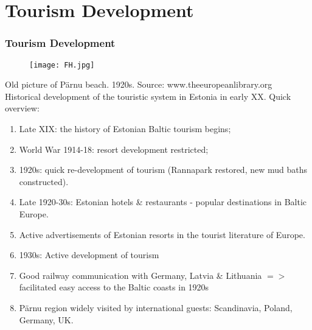 \documentclass[pdflatex,compress,8pt,
	xcolor={dvipsnames,dvipsnames,svgnames,x11names,table},
]{beamer}
\begin{document}
\section{Tourism Development}
\begin{frame}\frametitle{Tourism Development}
\begin{figure}[H]
	\centering
		\texttt{[image: FH.jpg]}
\end{figure}
Old picture of Pärnu beach. 1920s. Source: www.theeuropeanlibrary.org\\
Historical development of the touristic system in Estonia in early XX. Quick overview:
\begin{enumerate}
	\item Late XIX: the history of Estonian Baltic tourism begins;
	\item {} World War 1914-18: resort development restricted;
	\item 1920s: quick re-development of tourism (Rannapark restored, new mud baths constructed).
	\item Late 1920-30s: Estonian hotels \& restaurants - popular destinations in Baltic Europe.
	\item Active advertisements of Estonian resorts in the tourist literature of Europe.
	\item 1930s: Active development of tourism
	\item  Good railway communication with Germany, Latvia \& Lithuania $=>$ facilitated easy access to the Baltic coasts in 1920s
	\item Pärnu region widely visited by international guests: Scandinavia, Poland, Germany, UK.
\end{enumerate}
\end{frame} 
\end{document}

